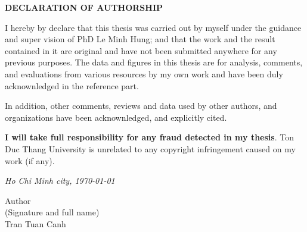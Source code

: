 \newpage	
\vspace{5cm} 
		
\begin{center}
{
\fontsize{16pt}{1}\selectfont
\textbf{DECLARATION OF AUTHORSHIP}
}
\end{center} 		
	\noindent
	
I hereby by declare that this thesis was carried out by myself under the guidance and super vision of PhD Le Minh Hung; and that the work and the result contained in it are original and have not been submitted anywhere for any previous purposes. The data and figures in this thesis are for analysis, comments, and evaluations from various resources by my own work and have been duly acknownledged in the reference part.

In addition, other comments, reviews and data used by other authors, and organizations have been acknownledged, and explicitly cited.

\textbf{I will take full responsibility for any fraud detected in my thesis}. Ton Duc Thang University is unrelated to any copyright infringement caused on my work (if any).





\begin{flushright}
{\it Ho Chi Minh city, \today{} }

Author \hskip 2cm\quad
~\\
(Signature and full name) \hskip 0.4cm\quad
~\\[1.5cm] 
Tran Tuan Canh\hskip 1.5cm\quad


\end{flushright}
\newpage